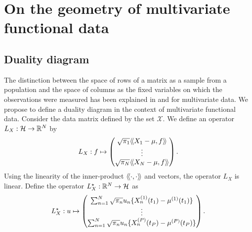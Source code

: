 \section{On the geometry of multivariate functional data} %
\label{sec:geometric_point_of_view_mfpca}

\subsection{Duality diagram} %
\label{sub:duality_diagram}

The distinction between the space of rows of a matrix as a sample from a population and the space of columns as the fixed variables on which the observations were measured has been explained in \cite{holmesMultivariateDataAnalysis2008} and \cite{delacruzDualityDiagramData2011} for multivariate data. We propose to define a duality diagram in the context of multivariate functional data. Consider the data matrix defined by the set $\mathcal{X}$. We define an operator $L_X : \mathcal{H} \rightarrow \mathbb{R}^N$ by
\begin{equation}
    L_X: f \mapsto \begin{pmatrix}
        \sqrt{\pi_1}\langle\!\langle X_1 - \mu, f\rangle\!\rangle \\
        \vdots \\
        \sqrt{\pi_N}\langle\!\langle X_N - \mu, f\rangle\!\rangle
    \end{pmatrix}.
\end{equation}
Using the linearity of the inner-product $\langle\!\langle\cdot, \cdot\rangle\!\rangle$ and vectors, the operator $L_X$ is linear. Define the operator $L^\star_X : \mathbb{R}^N \rightarrow \mathcal{H}$ as
\begin{equation}
    L^\star_X: u \mapsto \begin{pmatrix}
       \sum_{n = 1}^N \sqrt{\pi_n} u_n \{X_n^{(1)}(t_1) - \mu^{(1)}(t_1)\} \\ 
       \vdots \\ 
       \sum_{n = 1}^N \sqrt{\pi_n} u_n \{X_n^{(P)}(t_P) - \mu^{(P)}(t_P)\}
    \end{pmatrix}.
\end{equation}

